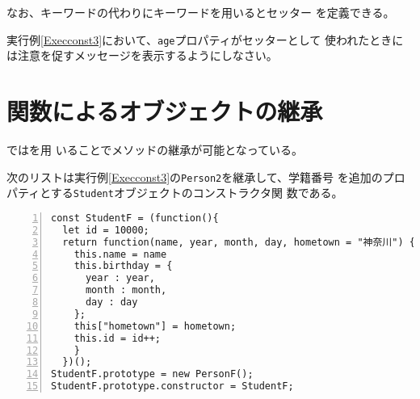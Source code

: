 なお、キーワードの代わりにキーワードを用いるとセッター
を定義できる。

\begin{Prob}\upshape
 実行例\ref{Execconst3}において、\texttt{age}プロパティがセッターとして
 使われたときには注意を促すメッセージを表示するようにしなさい。
\end{Prob}
\section{関数によるオブジェクトの継承}
\JS ではを用
いることでメソッドの継承が可能となっている。
\begin{Exec}\upshape\label{Execconst4}
次のリストは実行例\ref{Execconst3}の\texttt{Person2}を継承して、学籍番号
 を追加のプロパティとする\texttt{Student}オブジェクトのコンストラクタ関
 数である。
\begin{Verbatim}[numbers=left]
const StudentF = (function(){
  let id = 10000;
  return function(name, year, month, day, hometown = "神奈川") {
    this.name = name
    this.birthday = {
      year : year,
      month : month,
      day : day
    };
    this["hometown"] = hometown;
    this.id = id++;
    }
  })();
StudentF.prototype = new PersonF();
StudentF.prototype.constructor = StudentF;
\end{Verbatim}
\end{Exec}
\iffalse
\begin{itemize}
 \item \texttt{name}などのプロパティはオブジェクトごとに違う値をとるので
       \texttt{Person2.rototype}内には置くことができない。したがって、そ
       れぞれを\texttt{this}のプロパティに格納する(２行目から６行目)。
 \item \texttt{Person2}の\texttt{prototype}を利用するために、
       \texttt{Student.prototype}にオブジェクトを新規に作成して代入する
       (8行目)。これにより、この後で\texttt{Person2}のプロパティが変更さ
       れても、\texttt{Student}オブジェクトには影響がでない。
 \item \texttt{Student.prototype.constructor}を\texttt{Student}に戻して
       おく(9行目)
\end{itemize}
実行結果は次のとおりである。
\begin{Verbatim}
>s = new Student("me",1323300,1995,4,1)
Student {name: "me", year: 1995, month: 4, day: 1, id: 1323300}
>s.age;
20
>s.name
"me"
>s+"";
"私の名前はmeです"
>s.constructor;
Student(n, id, y, m, d){
  this.name   = n;
  this.year  = y;
  this.month = m;
  this.day   = d;
  this.id    = id;
}
\end{Verbatim}
\texttt{Person2}で定義されたメソッドが利用できていることがわかる。
 \begin{Prob}\upshape
	実行例\ref{Execconst4}の\texttt{Student}に所属学部を表示するメソッドを
	追加しなさい。所属学部のプロパティは追加しないで学籍番号から求めること。
\end{Prob}
\fi
